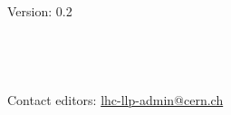 

\thispagestyle{empty}%

\begin{fullwidth}
\sffamily
{
  \Large
  \fontsize{18}{24}\selectfont 
  \@title
}\\
\vspace{1\baselineskip}
{\Large 
\noindent Version: 0.2 \\
\vspace{1\baselineskip}
\noindent
\@date\\
\vspace{1\baselineskip}
\noindent
 \\
~\\
%


~\\
\noindent Contact editors: \href{mailto:lhc-lp-admin@cern.ch}{lhc-llp-admin@cern.ch}
}\\
\end{fullwidth}
\vspace*{\fill}
